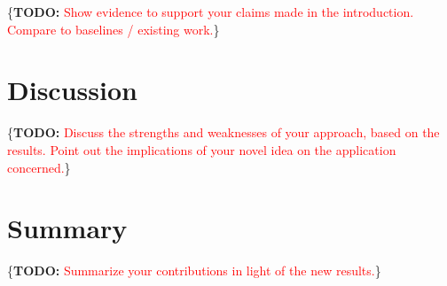 \documentclass{article}
\newcommand{\TODO}[1]{\{\textbf{TODO: }\textcolor{red}{#1}\}}
\begin{document}
\TODO{Show evidence to support your claims made in the introduction. Compare to baselines / existing work.}







\section{Discussion}

\TODO{Discuss the strengths and weaknesses of your approach, based on the results. Point out the implications of your novel idea on the application concerned.}








\section{Summary}

\TODO{Summarize your contributions in light of the new results.}



\end{document}
